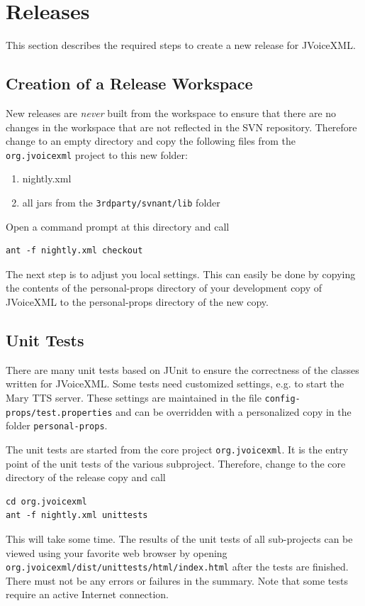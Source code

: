 \documentclass[11pt,a4paper]{article}
\begin{document}
\section{Releases}

This section describes the required steps to create a new release for
JVoice\-XML.

\subsection{Creation of a Release Workspace}

New releases are \emph{never} built from the workspace to ensure that there are
no changes in the workspace that are not reflected in the SVN repository.
Therefore change to an empty directory and copy the following files from the
\texttt{org.jvoicexml} project to this new folder:
\begin{enumerate}
  \item nightly.xml
  \item all jars from the \texttt{3rdparty/svnant/lib} folder
\end{enumerate}
Open a command prompt at this directory and call
\begin{lstlisting}
ant -f nightly.xml checkout
\end{lstlisting}

The next step is to adjust you local settings. This can easily be done by
copying the contents of the personal-props directory of your development copy
of JVoiceXML to the personal-props directory of the new copy.


\subsection{Unit Tests}

There are many unit tests based on JUnit to ensure the correctness of the
classes written for JVoiceXML. Some tests need customized settings, e.g. to
start the Mary TTS server. These settings are maintained in the file
\texttt{config-props/test.properties} and can be overridden with a
personalized copy in the folder \texttt{personal-props}.

The unit tests are started from the core project
\texttt{org.jvoicexml}. It is the entry point of the unit tests of the various subproject. Therefore, change to the core directory of the release copy and call
\begin{lstlisting}
cd org.jvoicexml
ant -f nightly.xml unittests
\end{lstlisting}
This will take some time. The results of the unit tests of all sub-projects can
be viewed using your favorite web browser by opening
\texttt{org.jvoicexml/dist/unittests/html/index.html} after the tests are
finished. There must not be any errors or failures in the summary. Note that
some tests require an active Internet connection. 
\end{document}
